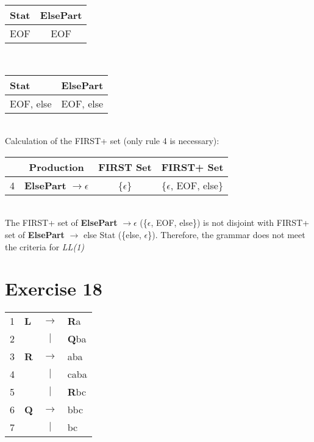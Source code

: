 \documentclass[11pt]{article} %
\begin{document}
\begin{tabular}{|p{2cm}|c|} \hline 
\textbf{Stat}
& \textbf{ElsePart} \\\hline

EOF
& EOF \\\hline 
\end{tabular} \\

\begin{tabular}{|p{2cm}|c|} \hline 
\textbf{Stat}
& \textbf{ElsePart} \\\hline 

EOF, else
& EOF, else \\\hline 
\end{tabular}\\

\noindent Calculation of the FIRST+ set (only rule 4 is necessary):\\

\begin{tabular}{|c|c|c|c|} \hline 
& Production
& FIRST Set
& FIRST+ Set \\\hline

4
& \textbf{ElsePart} $\rightarrow \epsilon$
& \{$\epsilon$\}
& \{$\epsilon$, EOF, else\} \\\hline 
\end{tabular}\\

\noindent The FIRST+ set of \textbf{ElsePart} $\rightarrow \epsilon$ (\{$\epsilon$, EOF, else\}) is not disjoint with FIRST+ set of \textbf{ElsePart} $\rightarrow$ else Stat (\{else, $\epsilon$\}). Therefore, the grammar does not meet the criteria for \textit{LL(1)}\\

\section*{Exercise 18}
\begin{tabular}{llcl}
1
& \textbf{L}
& $\rightarrow$
& \textbf{R}a \\

2
& 
& $\vert$
& \textbf{Q}ba \\

3
& \textbf{R}
& $\rightarrow$
& aba \\

4
& 
& $\vert$
& caba \\

5
& 
& $\vert$
& \textbf{R}bc \\

6
& \textbf{Q}
& $\rightarrow$
& bbc \\

7
& 
& $\vert$
& bc \\
\end{tabular}\\
\end{document}
